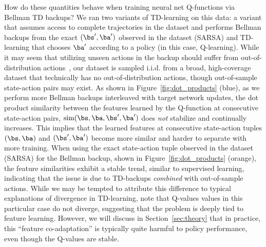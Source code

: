 How do these quantities behave when training neural net Q-functions via Bellman TD backups? We ran two variants of TD-learning on this data: a variant that assumes access to complete trajectories in the dataset and performs Bellman backups from the exact $(\bs', \ba')$ observed in the dataset (SARSA) and TD-learning that chooses $\ba'$ according to a policy (in this case, Q-learning). While it may seem that utilizing unseen actions in the backup should suffer from out-of-distribution actions~\citep{kumar2019stabilizing}, our dataset is sampled i.i.d. from a broad, high-coverage dataset that technically has no out-of-distribution actions, though out-of-sample state-action pairs may exist. As shown in Figure~\ref{fig:dot_products} (blue), as we perform more Bellman backups interleaved with target network updates, the dot product similarity between the features learned by the Q-function at consecutive state-action pairs, $\text{sim}(\bs, \ba, \bs', \ba')$ does \emph{not} stabilize and continually increases. This implies that the learned features at consecutive state-action tuples $(\bs, \ba)$ and $(\bs', \ba')$ become more similar and harder to separate with more training. When using the exact state-action tuple observed in the dataset (SARSA) for the Bellman backup, shown in Figure~\ref{fig:dot_products} (orange), the feature similarities exhibit a stable trend, similar to supervised learning, indicating that the issue is due to TD-backups \emph{combined} with out-of-sample actions. While we may be tempted to attribute this difference to typical explanations of divergence in TD-learning, note that Q-values values in this particular case do not diverge, suggesting that the problem is deeply tied to feature learning. However, we will discuss in Section~\ref{sec:theory} that in practice, this ``feature co-adaptation'' is typically quite harmful to policy performance, even though the Q-values are stable.  
